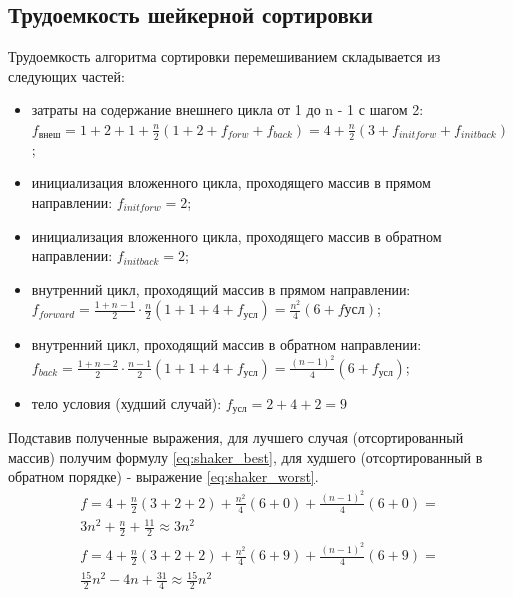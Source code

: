 \documentclass[a4paper,oneside,14pt]{extreport}
\begin{document}
\subsection{Трудоемкость шейкерной сортировки}
Трудоемкость алгоритма сортировки перемешиванием складывается из следующих частей:
\begin{itemize}
	\item затраты на содержание внешнего цикла от 1 до n - 1 с шагом 2: $f_{\text{внеш}}=1 + 2 + 1 + \frac{n}{2}(1 + 2 + f_{forw} + f_{back}) = 4 + \frac{n}{2}(3 + f_{init forw} + f_{init back})$;
	\item инициализация вложенного цикла, проходящего массив в прямом направлении: $f_{init forw}=2$;
	\item инициализация вложенного цикла, проходящего массив в обратном направлении: $f_{init back}=2$;
	\item внутренний цикл, проходящий массив в прямом направлении: $f_{forward}= \frac{1 + n - 1}{2} \cdot \frac{n}{2}(1 + 1 + 4 + f_{\text{усл}}) = \frac{n^2}{4} (6 + f{\text{усл}})$;
	\item внутренний цикл, проходящий массив в обратном направлении: $f_{back}= \frac{1 + n - 2}{2} \cdot \frac{n-1}{2}(1 + 1 + 4 + f_{\text{усл}}) = \frac{(n-1)^2}{4} (6 + f_{\text{усл}})$;
	\item тело условия (худший случай): $f_{\text{усл}} = 2 + 4 + 2 = 9$
\end{itemize}

Подставив полученные выражения, для лучшего случая (отсортированный массив) получим формулу \ref{eq:shaker_best}, для худшего (отсортированный в обратном порядке) - выражение \ref{eq:shaker_worst}.
\begin{equation} \label{eq:shaker_best}
\begin{array}{ll}
f = 4 + \frac{n}{2}(3 + 2 + 2) + \frac{n^2}{4} (6 + 0) + \frac{(n-1)^2}{4} (6 + 0) =\\ 3n^2 + \frac{n}{2} + \frac{11}{2} \approx 3n^2
\end{array}
\end{equation}
\begin{equation} \label{eq:shaker_worst}
\begin{array}{ll}
f = 4 + \frac{n}{2}(3 + 2 + 2) + \frac{n^2}{4} (6 + 9) + \frac{(n-1)^2}{4} (6 + 9) =\\ \frac{15}{2}n^2 - 4n + \frac{31}{4} \approx \frac{15}{2}n^2
\end{array}
\end{equation}
\end{document}

